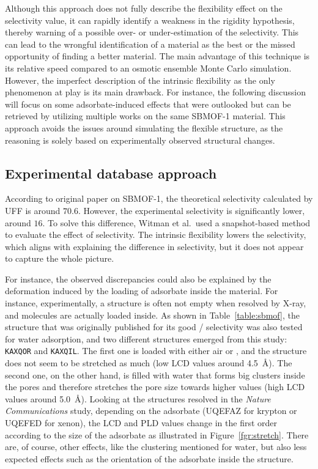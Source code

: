 \documentclass[main]{subfiles}
\begin{document}
Although this approach does not fully describe the flexibility effect on the selectivity value, it can rapidly identify a weakness in the rigidity hypothesis, thereby warning of a possible over- or under-estimation of the selectivity. This can lead to the wrongful identification of a material as the best or the missed opportunity of finding a better material. The main advantage of this technique is its relative speed compared to an osmotic ensemble Monte Carlo simulation.\autocite{Bousquet2012} However, the imperfect description of the intrinsic flexibility as the only phenomenon at play is its main drawback. For instance, the following discussion will focus on some adsorbate-induced effects that were outlooked but can be retrieved by utilizing multiple works on the same SBMOF-1 material. This approach avoids the issues around simulating the flexible structure, as the reasoning is solely based on experimentally observed structural changes.


\subsection{Experimental database approach}

According to original paper on SBMOF-1,\autocite{Banerjee_2016} the theoretical selectivity calculated by UFF is around $70.6$. However, the experimental selectivity is significantly lower, around $16$. To solve this difference, Witman et al.\ used a snapshot-based method to evaluate the effect of selectivity. The intrinsic flexibility lowers the selectivity, which aligns with explaining the difference in selectivity, but it does not appear to capture the whole picture. 

For instance, the observed discrepancies could also be explained by the deformation induced by the loading of adsorbate inside the material. For instance, experimentally, a structure is often not empty when resolved by X-ray, and molecules are actually loaded inside. As shown in Table~\ref{table:sbmof}, the structure that was originally published for its good / selectivity\autocite{Yeh2012,Banerjee2012} was also tested for water adsorption, and two different structures emerged from this study: \texttt{KAXQOR} and \texttt{KAXQIL}. The first one is loaded with either air or , and the structure does not seem to be stretched as much (low LCD values around \SI{4.5}{\angstrom}). The second one, on the other hand, is filled with water that forms big clusters inside the pores and therefore stretches the pore size towards higher values (high LCD values around \SI{5.0}{\angstrom}). Looking at the structures resolved in the \emph{Nature Communications} study\autocite{Banerjee_2016}, depending on the adsorbate (UQEFAZ for krypton or UQEFED for xenon), the LCD and PLD values change in the first order according to the size of the adsorbate as illustrated in Figure~\ref{fgr:stretch}. There are, of course, other effects, like the clustering mentioned for water, but also less expected effects such as the orientation of the adsorbate inside the structure. 
\end{document}

